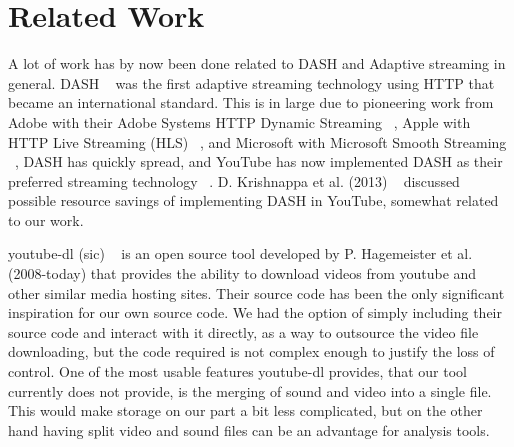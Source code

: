 \section{Related Work}
A lot of work has by now been done related to DASH and Adaptive streaming in
general. DASH ~\cite{iso-dash-2014} was the first adaptive streaming
technology using HTTP that became an international standard. This is in large
due to pioneering work from Adobe with their Adobe Systems HTTP Dynamic
Streaming ~\cite{adobe-http-dynamic-streaming}, Apple with HTTP Live Streaming
(HLS) ~\cite{apple-http-streaming}, and Microsoft with Microsoft Smooth
Streaming ~\cite{microsoft-smooth-streaming}, DASH has quickly spread, and
YouTube has now implemented DASH as their preferred streaming technology
~\cite{Google I/O 2013}. 
D. Krishnappa et al. (2013) ~\cite{dashing-youtube} discussed possible resource
savings of implementing DASH in YouTube, somewhat related to our work. 

youtube-dl (sic) ~\cite{youtube-dl} is an open source tool developed by P.
Hagemeister et al. (2008-today) that provides the ability to download videos
from youtube and other similar media hosting sites. Their source code has been
the only significant inspiration for our own source code. We had the option of
simply including their source code and interact with it directly, as a way to
outsource the video file downloading, but the code required is not complex
enough to justify the loss of control. One of the most usable features
youtube-dl provides, that our tool currently does not provide, is the merging of
sound and video into a single file. This would make storage on our part a bit
less complicated, but on the other hand having split video and sound files can
be an advantage for analysis tools. 

